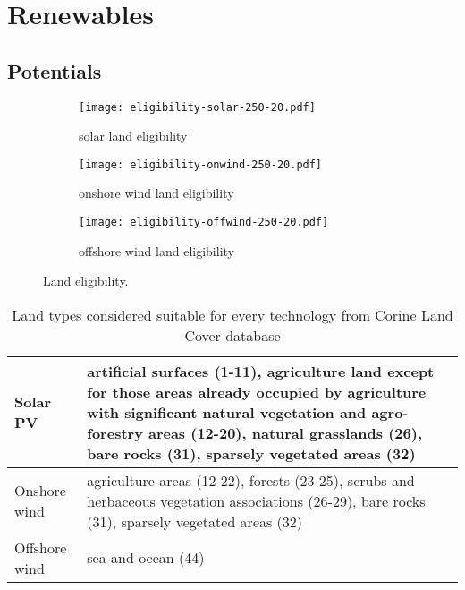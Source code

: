 
\section{Renewables}
\label{sec:si:renewables}

\subsection{Potentials}
\label{sec:si:renewable-potentials}

\begin{landscape}

\begin{figure}
    \centering
    \begin{subfigure}[t]{0.5\textwidth}
            \centering
        \caption{solar land eligibility}
        \texttt{[image: eligibility-solar-250-20.pdf]}
    \end{subfigure}
    \begin{subfigure}[t]{0.5\textwidth}
        \centering
        \caption{onshore wind land eligibility}
        \texttt{[image: eligibility-onwind-250-20.pdf]}
    \end{subfigure}
    \begin{subfigure}[t]{0.5\textwidth}
        \centering
        \caption{offshore wind land eligibility}
        \texttt{[image: eligibility-offwind-250-20.pdf]}
    \end{subfigure}
    \caption{Land eligibility.}
    \label{fig:eligibility}
\end{figure}

\end{landscape}
\restoregeometry

\begin{table}
    \caption{Land types considered suitable for every technology from Corine Land Cover database}
    \small
    \begin{tabularx}{\textwidth}{lX}
        \toprule
        Solar PV & artificial surfaces (1-11), agriculture land except for those
        areas already occupied by agriculture with significant natural
        vegetation and agro-forestry areas (12-20), natural grasslands (26), bare rocks (31),
        sparsely vegetated areas (32) \\ \midrule
        Onshore wind & agriculture areas (12-22), forests (23-25), scrubs and herbaceous vegetation associations (26-29), bare rocks (31), sparsely vegetated areas (32) \\ \midrule
        Offshore wind & sea and ocean (44) \\ \bottomrule
    \end{tabularx}
    \label{tab:eligibility}
\end{table}


